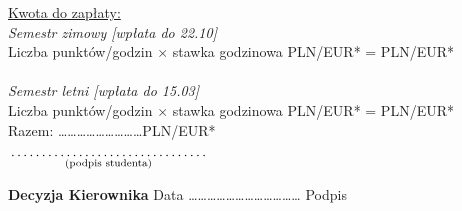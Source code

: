 \documentclass[a4paper,11pt]{article}
\newcommand{\fillField}[2]{
    $\underset{\text{#1}}{\parbox[t]{#2}{\dotfill}}$
}
\begin{document}
{\footnotesize
\noindent
\underline{Kwota do zapłaty:}\\
\textit{Semestr zimowy [wpłata do 22.10]}\\
Liczba punktów/godzin \dotfill $\times$ stawka godzinowa \dotfill PLN/EUR* = \dotfill PLN/EUR* \\\\
\textit{Semestr letni [wpłata do 15.03]}\\
Liczba punktów/godzin \dotfill $\times$ stawka godzinowa \dotfill PLN/EUR* = \dotfill PLN/EUR* \\

\hspace{\fill} Razem: \ldots\ldots\ldots\ldots\ldots\ldots\ldots\ldots\ldots PLN/EUR* \hspace{2.0cm}
}

\vskip 0.6cm

\hspace{\fill} \fillField{(podpis studenta)}{5cm} \hspace{2.0cm}
\vskip 1.0cm

\noindent
\textbf{Decyzja Kierownika} \dotfill
\vskip 0.5cm
\noindent
Data ……………………………… Podpis \dotfill
\end{document}
